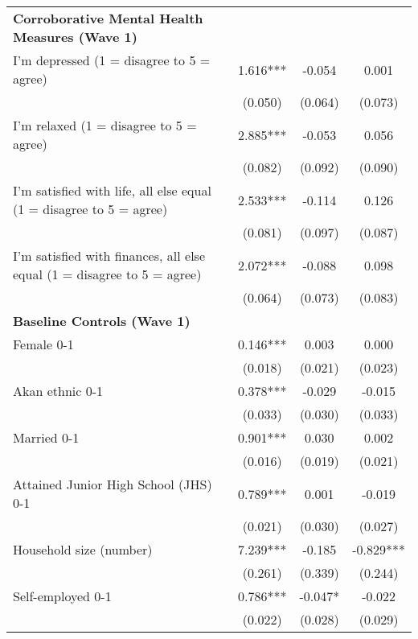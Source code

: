 \begin{ThreePartTable}
\begin{table}[tbp]
\begin{tabular}{lccc}
\textbf{Corroborative Mental Health Measures (Wave 1)} & & & \\ 
 I'm depressed (1 = disagree to 5 = agree) & 1.616*** & -0.054 & 0.001 \\ [0.1em] 
                   &      (0.050)     &      (0.064)     &      (0.073)     \\ [0.1em] 
 I'm relaxed (1 = disagree to 5 = agree) & 2.885*** & -0.053 & 0.056 \\ [0.1em] 
                   &      (0.082)     &      (0.092)     &      (0.090)     \\ [0.1em] 
 I'm satisfied with life, all else equal (1 = disagree to 5 = agree) & 2.533*** & -0.114 & 0.126 \\ [0.1em] 
                   &      (0.081)     &      (0.097)     &      (0.087)     \\ [0.1em] 
 I'm satisfied with finances, all else equal (1 = disagree to 5 = agree) & 2.072*** & -0.088 & 0.098 \\ [0.1em] 
                   &      (0.064)     &      (0.073)     &      (0.083)     \\ [0.1em] 
\textbf{Baseline Controls (Wave 1)} & & & \\ 
 Female 0-1 & 0.146*** & 0.003 & 0.000 \\ [0.1em] 
                   &      (0.018)     &      (0.021)     &      (0.023)     \\ [0.1em] 
 Akan ethnic 0-1 & 0.378*** & -0.029 & -0.015 \\ [0.1em] 
                   &      (0.033)     &      (0.030)     &      (0.033)     \\ [0.1em] 
 Married 0-1 & 0.901*** & 0.030 & 0.002 \\ [0.1em] 
                   &      (0.016)     &      (0.019)     &      (0.021)     \\ [0.1em] 
 Attained Junior High School (JHS) 0-1 & 0.789*** & 0.001 & -0.019 \\ [0.1em] 
                   &      (0.021)     &      (0.030)     &      (0.027)     \\ [0.1em] 
 Household size (number) & 7.239*** & -0.185 & -0.829*** \\ [0.1em] 
                   &      (0.261)     &      (0.339)     &      (0.244)     \\ [0.1em] 
 Self-employed 0-1 & 0.786*** & -0.047* & -0.022 \\ [0.1em] 
                   &      (0.022)     &      (0.028)     &      (0.029)     \\ [0.1em] 

\end{tabular}
\end{table}
\end{ThreePartTable}
